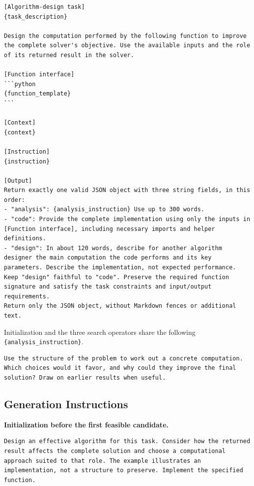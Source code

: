 \documentclass{article}
\begin{document}
\noindent\begin{minipage}{\linewidth}
\begin{verbatim}
[Algorithm-design task]
{task_description}

Design the computation performed by the following function to improve the complete solver's objective. Use the available inputs and the role of its returned result in the solver.

[Function interface]
```python
{function_template}
```

[Context]
{context}

[Instruction]
{instruction}

[Output]
Return exactly one valid JSON object with three string fields, in this order:
- "analysis": {analysis_instruction} Use up to 300 words.
- "code": Provide the complete implementation using only the inputs in [Function interface], including necessary imports and helper definitions.
- "design": In about 120 words, describe for another algorithm designer the main computation the code performs and its key parameters. Describe the implementation, not expected performance.
Keep "design" faithful to "code". Preserve the required function signature and satisfy the task constraints and input/output requirements.
Return only the JSON object, without Markdown fences or additional text.
\end{verbatim}
\end{minipage}\par

Initialization and the three search operators share the following \texttt{\{analysis\_instruction\}}.

\noindent\begin{minipage}{\linewidth}
\begin{verbatim}
Use the structure of the problem to work out a concrete computation. Which choices would it favor, and why could they improve the final solution? Draw on earlier results when useful.
\end{verbatim}
\end{minipage}\par

\subsection{Generation Instructions}\label{generation-instructions}

\noindent\begin{minipage}{\linewidth}
\textbf{Initialization before the first feasible candidate.}

\begin{verbatim}
Design an effective algorithm for this task. Consider how the returned result affects the complete solution and choose a computational approach suited to that role. The example illustrates an implementation, not a structure to preserve. Implement the specified function.
\end{verbatim}
\end{minipage}\par
\end{document}
